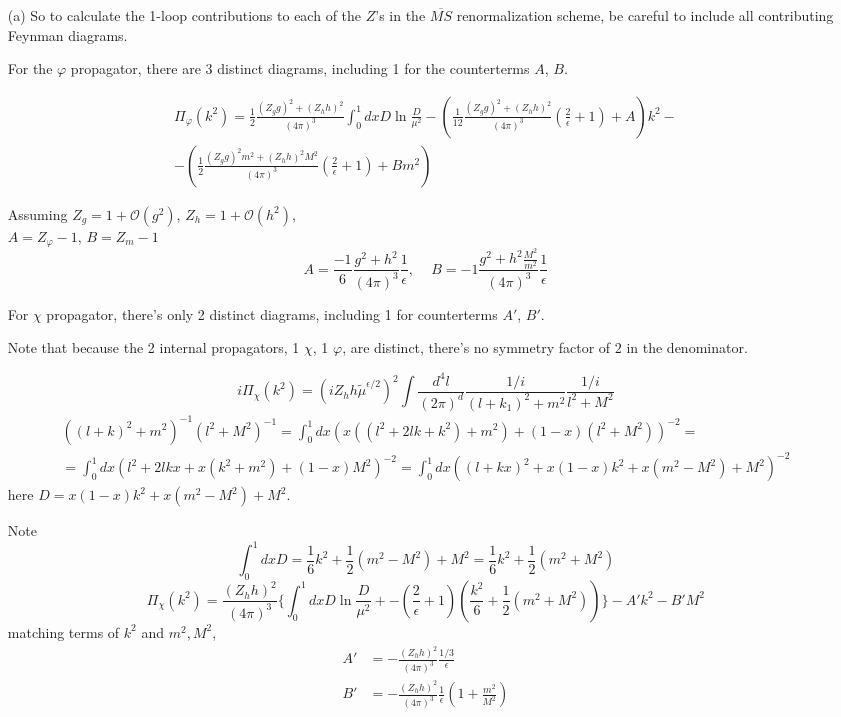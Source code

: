 \documentclass[twoside]{amsart}
\begin{document}
\hrulefill





\begin{itemize}
\item[(a)] So to calculate the 1-loop contributions to each of the $Z$'s in the $\overline{MS}$ renormalization scheme, be careful to include all contributing Feynman diagrams.  

For the $\varphi$ propagator, there are 3 distinct diagrams, including 1 for the counterterms $A$, $B$.  

\[
\begin{gathered}
  \Pi_{\varphi}(k^2) = \frac{1}{2} \frac{ (Z_g g)^2 + (Z_h h)^2 }{ (4\pi)^3} \int_0^1 dx D\ln{ \frac{D}{\mu^2 }} - \left( \frac{1}{12} \frac{ (Z_g g)^2 + (Z_h h)^2 }{ (4\pi)^3} \left( \frac{2}{ \epsilon } + 1 \right) + A \right) k^2 - \\
  - \left( \frac{1}{2} \frac{ (Z_g g)^2 m^2 + (Z_h h)^2 M^2 }{ (4\pi)^3} \left( \frac{2}{ \epsilon } + 1 \right) + B m^2 \right)
\end{gathered}
\]

Assuming $Z_g = 1 + \mathcal{O}(g^2)$, $Z_h = 1 + \mathcal{O}(h^2)$, \\
$A = Z_{\varphi}  -1$, $B = Z_m - 1$
\[
\boxed{ A = \frac{-1}{6} \frac{ g^2 + h^2 }{ (4\pi)^3} \frac{1}{ \epsilon }, \quad \, B = -1 \frac{ g^2 + h^2 \frac{M^2}{m^2}}{ (4\pi)^3} \frac{1}{\epsilon }  }
\]

For $\chi$ propagator, there's only 2 distinct diagrams, including 1 for counterterms $A'$, $B'$.  

Note that because the 2 internal propagators, 1 $\chi$, 1 $\varphi$, are distinct, there's no symmetry factor of $2$ in the denominator.  

\[
i \Pi_{\chi}(k^2 ) = ( i Z_h h \widetilde{\mu}^{\epsilon/2})^2 \int \frac{d^4l}{(2\pi)^d} \frac{ 1 /i }{ (l + k_1)^2 + m^2 } \frac{ 1/i }{ l^2 + M^2 } 
\]
\[
\begin{gathered}
  ( (l+k)^2 + m^2 )^{-1} (l^2 + M^2)^{-1} = \int_0^1 dx \left( x ( (l^2 + 2lk + k^2 ) + m^2 )  + ( 1 - x) (l^2 + M^2 ) \right)^{-2} = \\
   = \int_0^1 dx ( l^2 + 2lkx + x(k^2 + m^2) + (1-x)M^2 )^{-2} = \int_0^1 dx (( l+kx)^2 + x(1-x) k^2 + x(m^2 - M^2) + M^2 )^{-2}
\end{gathered}
\]
here $D = x(1-x)k^2 + x(m^2 - M^2) + M^2$.  

Note
\[
\int_0^1 dx D  = \frac{1}{6} k^2 + \frac{1}{2} ( m^2 - M^2) + M^2 = \frac{1}{6} k^2 + \frac{1}{2} (m^2 + M^2 )
\]
\[
\Pi_{\chi}(k^2 ) = \frac{ (Z_h h)^2}{(4\pi)^3} \lbrace \int_0^1 dx D \ln{ \frac{D}{ \mu^2 } } + - \left( \frac{2}{ \epsilon } +1 \right) \left( \frac{k^2 }{6} + \frac{1}{2} (m^2 + M^2 ) \right) \rbrace - A' k^2 - B' M^2 
\]
matching terms of $k^2$ and $m^2, M^2$,
\[
\boxed{
  \begin{aligned}
    A' & = - \frac{ (Z_h h)^2 }{ (4\pi)^3} \frac{ 1/3 }{ \epsilon } \\ 
    B' & = - \frac{ (Z_h h)^2 }{ (4\pi)^3 } \frac{1}{ \epsilon } \left( 1 + \frac{m^2 }{M^2 } \right) 
  \end{aligned} }
\]


\end{itemize}
\end{document}
